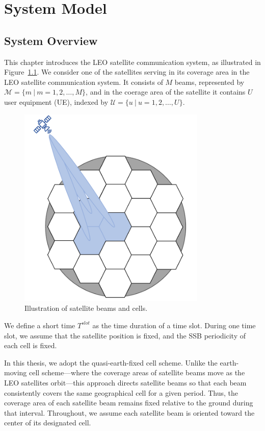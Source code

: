 \chapter{System Model}
\label{chap:model}
\section{System Overview}

This chapter introduces the LEO satellite communication system, as illustrated in Figure~\ref{fig_system}. We consider one of the satellites serving in its coverage area in the LEO satellite communication system. It consists of $M$ beams, represented by $\mathcal{M} = \{m\ |\ m = 1, 2, \ldots, M\}$, and in the coerage area of the satellite it contains $U$ user equipment (UE), indexed by $\mathcal{U} = \{u\ |\ u = 1, 2, \ldots, U\}$. 

\begin{figure}[h!]
    \centering
    \includegraphics[width=0.8\textwidth]{figure/system overview2.pdf}
    \caption{Illustration of satellite beams and cells.}
    \label{fig_system}
\end{figure}

We define a short time $T^{slot}$ as the time duration of a time slot. During one time slot, we assume that the satellite position is fixed, and the SSB periodicity of each cell is fixed.

In this thesis, we adopt the quasi-earth-fixed cell scheme. Unlike the earth-moving cell scheme—where the coverage areas of satellite beams move as the LEO satellites orbit—this approach directs satellite beams so that each beam consistently covers the same geographical cell for a given period. Thus, the coverage area of each satellite beam remains fixed relative to the ground during that interval. Throughout, we assume each satellite beam is oriented toward the center of its designated cell.

